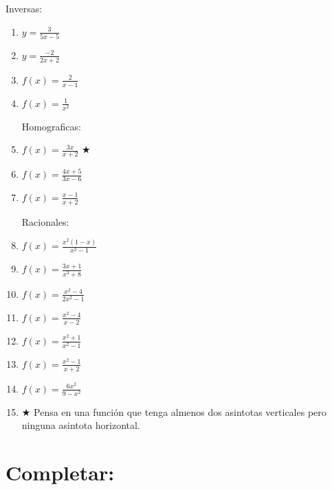 \documentclass[a4paper,11pt,spanish,sans]{exam}
\begin{document}
\begin{multicols}{2}

Inversas:
\begin{enumerate}%
\item $y=\frac{3}{5x-5}$
\item $y=\frac{-2}{2x+2}$
\item $f(x)=\frac{2}{x-1}$
\item $f(x)=\frac{1}{x^2}$

Homograficas:
\item $f(x)=\frac{3x}{x+2}$ $\bigstar$
\item $f(x)=\frac{4x+5}{3x-6}$
\item $f(x)=\frac{x-1}{x+2}$

\columnbreak

Racionales:
\item $f(x)=\frac{x^2(1-x)}{x^2-1}$
\item $f(x)=\frac{3x+1}{x^3+8}$%
\item $f(x)=\frac{x^2-4}{2x^2-1}$%
\item $f(x)=\frac{x^2-4}{x-2}$
\item $f(x)=\frac{x^2+1}{x^2-1}$
\item $f(x)=\frac{x^2-1}{x+2}$
\item $f(x)=\frac{6x^2}{9-x^2}$
\item $\bigstar$ Pensa en una función que tenga almenos dos asintotas verticales pero ninguna asintota horizontal.

\end{enumerate}
\end{multicols}

\section{Completar:}
\end{document}
